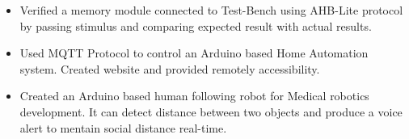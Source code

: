 \documentclass[10pt,a4paper]{altacv}
\begin{document}
\begin{itemize} 
\item Verified a memory module connected to Test-Bench using AHB-Lite protocol by passing stimulus and comparing expected result with actual results.
\end{itemize}
\divider

\begin{itemize}
\item Used MQTT Protocol to control an Arduino based Home Automation system. Created website and provided remotely accessibility.
\end{itemize}
\divider

\begin{itemize}
\item Created an Arduino based human following robot for Medical robotics development. It can detect distance between two objects and produce a voice alert to mentain social distance real-time.
\end{itemize}
\clearpage
\end{document}
